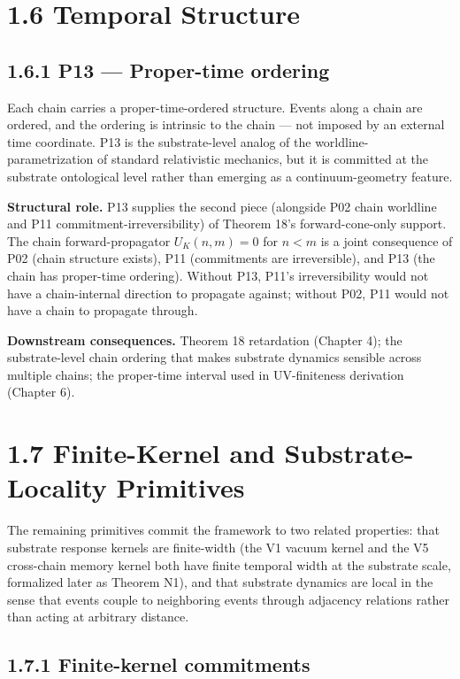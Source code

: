 \documentclass[11pt]{book}
\begin{document}
\section{1.6 Temporal Structure}

\subsection{1.6.1 P13 — Proper-time ordering}

Each chain carries a proper-time-ordered structure. Events along a chain are ordered, and the ordering is intrinsic to the chain — not imposed by an external time coordinate. P13 is the substrate-level analog of the worldline-parametrization of standard relativistic mechanics, but it is committed at the substrate ontological level rather than emerging as a continuum-geometry feature.

\textbf{Structural role.} P13 supplies the second piece (alongside P02 chain worldline and P11 commitment-irreversibility) of Theorem 18's forward-cone-only support. The chain forward-propagator $U_K(n,m) = 0$ for $n < m$ is a joint consequence of P02 (chain structure exists), P11 (commitments are irreversible), and P13 (the chain has proper-time ordering). Without P13, P11's irreversibility would not have a chain-internal direction to propagate against; without P02, P11 would not have a chain to propagate through.

\textbf{Downstream consequences.} Theorem 18 retardation (Chapter 4); the substrate-level chain ordering that makes substrate dynamics sensible across multiple chains; the proper-time interval used in UV-finiteness derivation (Chapter 6).

\section{1.7 Finite-Kernel and Substrate-Locality Primitives}

The remaining primitives commit the framework to two related properties: that substrate response kernels are finite-width (the V1 vacuum kernel and the V5 cross-chain memory kernel both have finite temporal width at the substrate scale, formalized later as Theorem N1), and that substrate dynamics are local in the sense that events couple to neighboring events through adjacency relations rather than acting at arbitrary distance.

\subsection{1.7.1 Finite-kernel commitments}
\end{document}
